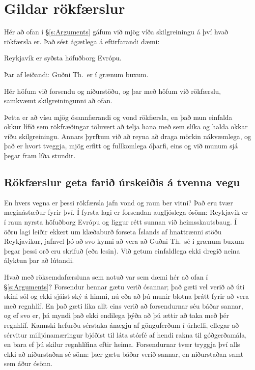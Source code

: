 \chapter{Gildar rökfærslur}\label{s:Valid}

Hér að ofan í \S\ref{s:Arguments} gáfum við mjög víða skilgreiningu á því hvað rökfærsla er. Það sést ágætlega á eftirfarandi dæmi:
	\begin{earg}
		\item[] Reykjavík er syðsta höfuðborg Evrópu.
		\item[Þar af leiðandi:] Guðni Th.\ er í grænum buxum.
	\end{earg}
Hér höfum við forsendu og niðurstöðu, og þar með höfum við rökfærslu, samkvæmt skilgreiningunni að ofan.

Þetta er að vísu mjög ósannfærandi og vond rökfærsla, en það mun einfalda okkur lífið sem rökfræðingar töluvert að telja hana með sem slíka og halda okkar víðu skilgreiningu. Annars þyrftum við að reyna að draga mörkin nákvæmlega, og það er hvort tveggja, mjög erfitt og fullkomlega óþarfi, eins og við munum sjá þegar fram líða stundir.

\section{Rökfærslur geta farið úrskeiðis á tvenna vegu}

En hvers vegna er þessi rökfærsla jafn vond og raun ber vitni? Það eru tvær meginástæður fyrir því. Í fyrsta lagi er forsendan augljóslega ósönn: Reykjavík er í raun nyrsta höfuðborg Evrópu og liggur rétt sunnan við heimsskautsbaug. Í öðru lagi leiðir ekkert um klæðaburð forseta Íslands af hnattrænni stöðu Reykjavíkur, jafnvel þó að svo kynni að vera að Guðni Th.\ sé í grænum buxum þegar þessi orð eru skrifuð (eða lesin). Við getum einfaldlega ekki dregið neina ályktun þar að lútandi.

Hvað með röksemdafærsluna sem notuð var sem dæmi hér að ofan í \S\ref{s:Arguments}? Forsendur hennar gætu verið ósannar; það gæti vel verið að úti skíni sól og ekki sjáist ský á himni, nú eða að þú munir blotna þrátt fyrir að vera með regnhlíf. En það gæti líka allt eins verið að forsendurnar séu báðar sannar, og ef svo er, þá myndi það ekki endilega þýða að þú ættir að taka með þér regnhlíf. Kannski hefurðu sérstaka ánægju af gönguferðum í úrhelli, ellegar að sérvitur milljónamæringur bjóðist til láta stórfé af hendi rakna til góðgerðamála, en bara ef þú skilur regnhlífina eftir heima. Forsendurnar tvær tryggja því alls ekki að niðurstaðan sé sönn: þær gætu báðar verið sannar, en niðurstaðan samt sem áður ósönn.

